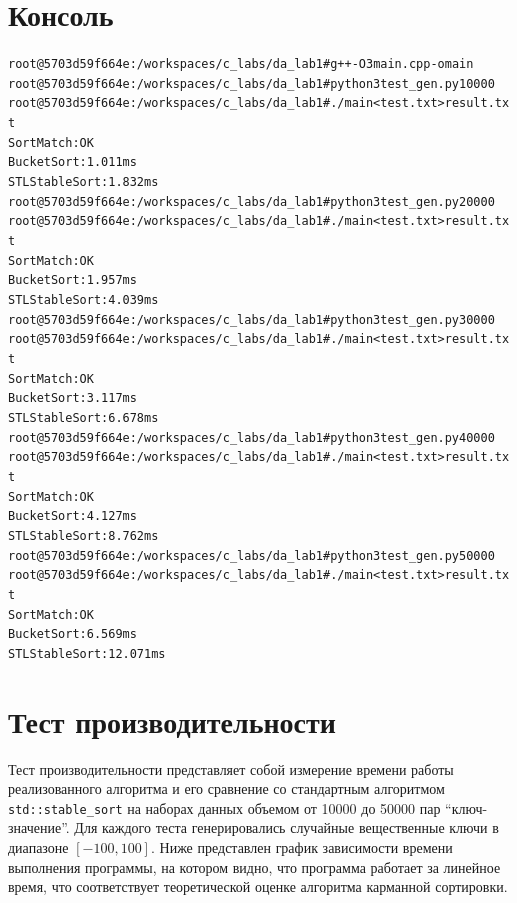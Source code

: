 \documentclass[unicode, 12pt, a4paper,oneside,fleqn]{article}
\begin{document}
\pagebreak

\section{Консоль}
\begin{alltt}
root@5703d59f664e:/workspaces/c_labs/da_lab1# g++ -O3 main.cpp -o main
root@5703d59f664e:/workspaces/c_labs/da_lab1# python3 test_gen.py 10000  
root@5703d59f664e:/workspaces/c_labs/da_lab1# ./main < test.txt > result.txt
Sort Match: OK
Bucket Sort: 1.011 ms
STL Stable Sort: 1.832 ms
root@5703d59f664e:/workspaces/c_labs/da_lab1# python3 test_gen.py 20000  
root@5703d59f664e:/workspaces/c_labs/da_lab1# ./main < test.txt > result.txt
Sort Match: OK
Bucket Sort: 1.957 ms
STL Stable Sort: 4.039 ms
root@5703d59f664e:/workspaces/c_labs/da_lab1# python3 test_gen.py 30000 
root@5703d59f664e:/workspaces/c_labs/da_lab1# ./main < test.txt > result.txt
Sort Match: OK
Bucket Sort: 3.117 ms
STL Stable Sort: 6.678 ms
root@5703d59f664e:/workspaces/c_labs/da_lab1# python3 test_gen.py 40000 
root@5703d59f664e:/workspaces/c_labs/da_lab1# ./main < test.txt > result.txt
Sort Match: OK
Bucket Sort: 4.127 ms
STL Stable Sort: 8.762 ms
root@5703d59f664e:/workspaces/c_labs/da_lab1# python3 test_gen.py 50000
root@5703d59f664e:/workspaces/c_labs/da_lab1# ./main < test.txt > result.txt
Sort Match: OK
Bucket Sort: 6.569 ms
STL Stable Sort: 12.071 ms
\end{alltt}
\pagebreak

\section{Тест производительности}

Тест производительности представляет собой измерение времени работы реализованного алгоритма и 
его сравнение со стандартным алгоритмом \texttt{std::stable\_sort} на наборах данных объемом от 10000 до 50000 пар \enquote{ключ-значение}. 
Для каждого теста генерировались случайные вещественные ключи в диапазоне $[-100, 100]$.
Ниже представлен график зависимости времени выполнения программы, на котором видно, что программа работает за линейное время, что соответствует теоретической оценке алгоритма карманной сортировки.

\begin{center}
\end{center}
\end{document}
